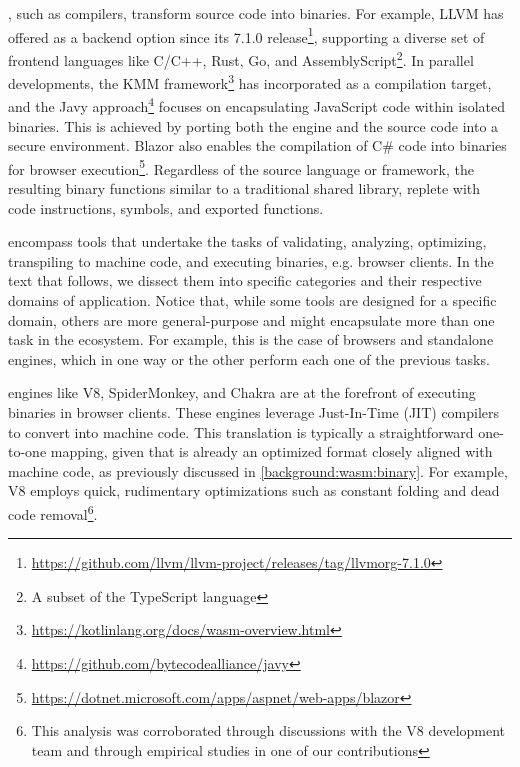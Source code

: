 , such as compilers, transform source code into \Wasm binaries. 
For example, LLVM has offered \Wasm as a backend option since its 7.1.0 release\footnote{\url{https://github.com/llvm/llvm-project/releases/tag/llvmorg-7.1.0}}, supporting a diverse set of frontend languages like C/C++, Rust, Go, and AssemblyScript\footnote{A subset of the TypeScript language}.
In parallel developments, the KMM framework\footnote{\url{https://kotlinlang.org/docs/wasm-overview.html}} has incorporated \Wasm as a compilation target, and the Javy approach\footnote{\url{https://github.com/bytecodealliance/javy}} focuses on encapsulating JavaScript code within isolated \Wasm binaries. 
This is achieved by porting both the engine and the source code into a secure \Wasm environment. 
Blazor also enables the compilation of C# code into \Wasm binaries for browser execution\footnote{\url{https://dotnet.microsoft.com/apps/aspnet/web-apps/blazor}}.
Regardless of the source language or framework, the resulting \Wasm binary functions similar to a traditional shared library, replete with code instructions, symbols, and exported functions.

 encompass tools that undertake the tasks of validating, analyzing, optimizing, transpiling to machine code, and executing \Wasm binaries, e.g. browser clients. 
In the text that follows, we dissect them into specific categories and their respective domains of application.
Notice that, while some tools are designed for a specific domain, others are more general-purpose and might encapsulate more than one task in the \Wasm ecosystem.
For example, this is the case of browsers and standalone engines, which in one way or the other perform each one of the previous tasks.


 engines like V8\cite{v8}, SpiderMonkey\cite{spidermonkey}, and Chakra\cite{chakra} are at the forefront of executing \Wasm binaries in browser clients. 
These engines leverage Just-In-Time (JIT) compilers to convert \Wasm into machine code. 
This translation is typically a straightforward one-to-one mapping, given that \Wasm is already an optimized format closely aligned with machine code, as previously discussed in \autoref{background:wasm:binary}. 
For example, V8 employs quick, rudimentary optimizations such as constant folding and dead code removal\footnote{This analysis was corroborated through discussions with the V8 development team and through empirical studies in one of our contributions\cite{CROW}}. 

